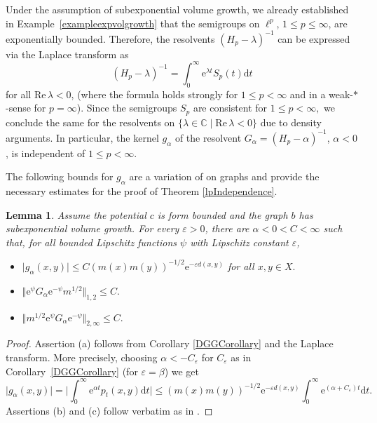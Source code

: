 \documentclass[10pt]{amsart}
\newtheorem{lemma}[theorem]{Lemma}
\theoremstyle{definition}
\begin{document}
Under the assumption of subexponential volume growth, we already established in Example~\ref{exampleexpvolgrowth} that the semigroups on $\ell^p$, $1\leq p\leq \infty$, are exponentially bounded. Therefore, the resolvents $( H_p-\lambda)^{-1}$ can be expressed via the Laplace transform as \[( H_p-\lambda)^{-1} = \int_0^\infty\mathrm{e}^{\lambda t}S_p(t)\mathrm{d}t\] for all $\mathrm{Re}\,\lambda<0$, (where the formula holds strongly for $1\leq p<\infty$ and in a weak-$\ast$-sense for $p=\infty$). Since the semigroups $S_p$ are consistent for $1\leq p< \infty,$ we conclude the same for the resolvents on $\lbrace \lambda\in\mathbb{C}\mid\mathrm{Re}\,\lambda<0\rbrace$ due to density arguments.
In particular, the kernel $g_\alpha$ of the resolvent $G_\alpha = ( H_p-\alpha)^{-1}$, $\alpha<0$, is independent of $1\leq p<\infty.$  

The following bounds for $g_\alpha$ are a variation of \cite[Lemma 4.2]{BauerHuaKeller} on graphs and provide the necessary estimates for the proof of Theorem \ref{lpIndependence}.

\begin{lemma}\label{Galpha} Assume the potential $c$ is form bounded and the graph $b$ has subexponential volume growth. For every $\varepsilon>0$, there are $\alpha<0<C<\infty$ such that, for all bounded Lipschitz functions $\psi$ with Lipschitz constant $\varepsilon$,
    \begin{itemize}
        \item [(a)] $\vert g_\alpha(x,y)\vert\leq C(m(x)m(y))^{-1\slash 2}\mathrm{e}^{-\varepsilon d(x,y)}$ for all $x,y\in X.$ 
        \item[(b)] $\Vert \mathrm{e}^\psi G_\alpha\mathrm{e}^{-\psi}m^{1\slash 2}\Vert_{1,2}\leq C.$  
        \item[(c)]  $\Vert m^{1\slash 2}\mathrm{e}^\psi G_\alpha\mathrm{e}^{-\psi}\Vert_{2,\infty}\leq C.$
    \end{itemize}
\end{lemma}
\begin{proof}
    Assertion (a) follows from Corollary \ref{DGGCorollary} and the Laplace transform. More precisely, choosing $\alpha<-C_\varepsilon$ for $C_\varepsilon$ as in Corollary~\ref{DGGCorollary} (for $\varepsilon=\beta$) we get
    \[\vert g_\alpha(x,y)\vert = \Big\vert\int_0^\infty\mathrm{e}^{\alpha t}p_t(x,y)\mathrm{d}t\Big\vert\leq(m(x)m(y))^{-1\slash 2}\mathrm{e}^{-\varepsilon d(x,y)}\int_0^\infty\mathrm{e}^{(\alpha+C_\varepsilon)t}\mathrm{d}t.\] 
    Assertions (b) and (c) follow verbatim as in \cite[Lemma 4.2]{BauerHuaKeller}.
\end{proof}
\end{document}
